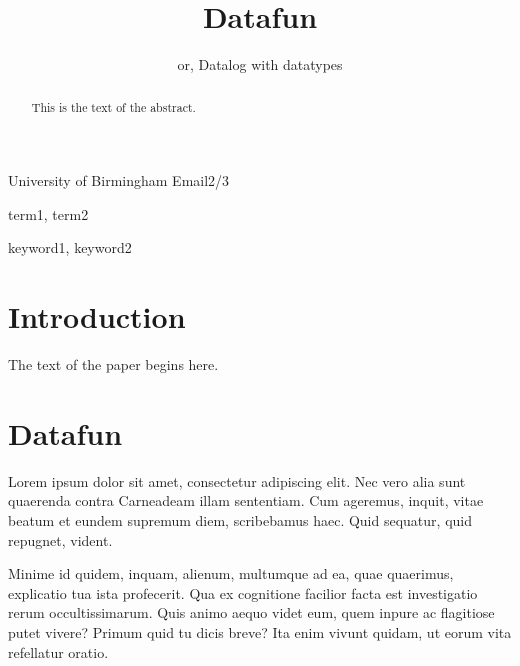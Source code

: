 \documentclass[preprint]{sigplanconf}
\begin{document}
\setlength{\pdfpageheight}{\paperheight}
\setlength{\pdfpagewidth}{\paperwidth}




\title{Datafun}
\subtitle{or, Datalog with datatypes}

           {University of Birmingham}
           {Email2/3}

\maketitle


\begin{abstract}
This is the text of the abstract.
\end{abstract}


\terms
term1, term2

\keywords
keyword1, keyword2

\section{Introduction}

The text of the paper begins here.

\section{Datafun}

Lorem ipsum dolor sit amet, consectetur adipiscing elit. Nec vero alia sunt
quaerenda contra Carneadeam illam sententiam. Cum ageremus, inquit, vitae beatum
et eundem supremum diem, scribebamus haec. Quid sequatur, quid repugnet, vident.

Minime id quidem, inquam, alienum, multumque ad ea, quae quaerimus, explicatio
tua ista profecerit. Qua ex cognitione facilior facta est investigatio rerum
occultissimarum. Quis animo aequo videt eum, quem inpure ac flagitiose putet
vivere? Primum quid tu dicis breve? Ita enim vivunt quidam, ut eorum vita
refellatur oratio.
\end{document}
